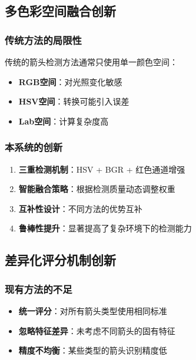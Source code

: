 \documentclass[12pt]{article}
\begin{document}
\subsection{多色彩空间融合创新}

\subsubsection{传统方法的局限性}

传统的箭头检测方法通常只使用单一颜色空间：

\begin{itemize}
    \item \textbf{RGB空间}：对光照变化敏感
    \item \textbf{HSV空间}：转换可能引入误差
    \item \textbf{Lab空间}：计算复杂度高
\end{itemize}

\subsubsection{本系统的创新}

\begin{enumerate}
    \item \textbf{三重检测机制}：HSV + BGR + 红色通道增强
    \item \textbf{智能融合策略}：根据检测质量动态调整权重
    \item \textbf{互补性设计}：不同方法的优势互补
    \item \textbf{鲁棒性提升}：显著提高了复杂环境下的检测能力
\end{enumerate}

\subsection{差异化评分机制创新}

\subsubsection{现有方法的不足}

\begin{itemize}
    \item \textbf{统一评分}：对所有箭头类型使用相同标准
    \item \textbf{忽略特征差异}：未考虑不同箭头的固有特征
    \item \textbf{精度不均衡}：某些类型的箭头识别精度低
\end{itemize}
\end{document}
